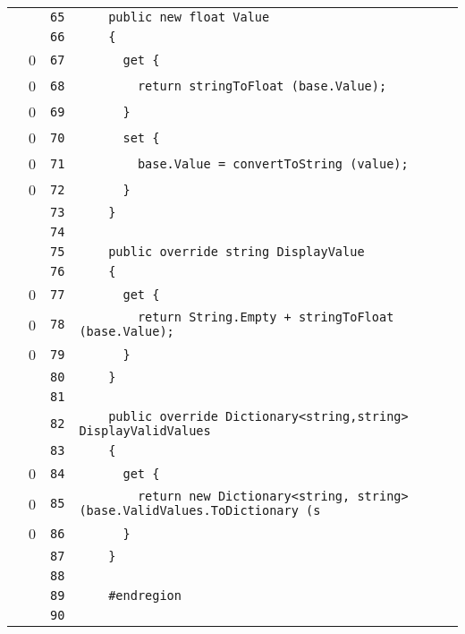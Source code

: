 \documentclass[a4paper,10pt]{article}
\begin{document}
\begin{longtable}[l]{lrrl}
\cellcolor{gray} &  & \verb~65~ & \verb~    public new float Value~\\
\cellcolor{gray} &  & \verb~66~ & \verb~    {~\\
\cellcolor{red} & 0 & \verb~67~ & \verb~      get {~\\
\cellcolor{red} & 0 & \verb~68~ & \verb~        return stringToFloat (base.Value);~\\
\cellcolor{red} & 0 & \verb~69~ & \verb~      }~\\
\cellcolor{red} & 0 & \verb~70~ & \verb~      set {~\\
\cellcolor{red} & 0 & \verb~71~ & \verb~        base.Value = convertToString (value);~\\
\cellcolor{red} & 0 & \verb~72~ & \verb~      }~\\
\cellcolor{gray} &  & \verb~73~ & \verb~    }~\\
\cellcolor{gray} &  & \verb~74~ & \verb~~\\
\cellcolor{gray} &  & \verb~75~ & \verb~    public override string DisplayValue~\\
\cellcolor{gray} &  & \verb~76~ & \verb~    {~\\
\cellcolor{red} & 0 & \verb~77~ & \verb~      get {~\\
\cellcolor{red} & 0 & \verb~78~ & \verb~        return String.Empty + stringToFloat (base.Value);~\\
\cellcolor{red} & 0 & \verb~79~ & \verb~      }~\\
\cellcolor{gray} &  & \verb~80~ & \verb~    }~\\
\cellcolor{gray} &  & \verb~81~ & \verb~~\\
\cellcolor{gray} &  & \verb~82~ & \verb~    public override Dictionary<string,string> DisplayValidValues~\\
\cellcolor{gray} &  & \verb~83~ & \verb~    {~\\
\cellcolor{red} & 0 & \verb~84~ & \verb~      get {~\\
\cellcolor{red} & 0 & \verb~85~ & \verb~        return new Dictionary<string, string>(base.ValidValues.ToDictionary (s~\\
\cellcolor{red} & 0 & \verb~86~ & \verb~      }~\\
\cellcolor{gray} &  & \verb~87~ & \verb~    }~\\
\cellcolor{gray} &  & \verb~88~ & \verb~~\\
\cellcolor{gray} &  & \verb~89~ & \verb~    #endregion~\\
\cellcolor{gray} &  & \verb~90~ & \verb~~\\

\end{longtable}
\end{document}
